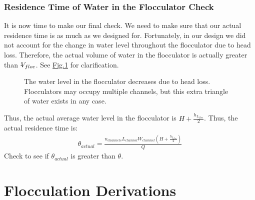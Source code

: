 \documentclass[letterpaper,10pt,english]{sphinxmanual}
\let\sphinxpxdimen\pdfpxdimen\else\newdimen\sphinxpxdimen
\begin{document}
{\subsection{Residence Time of Water in the Flocculator Check}
\label{\detokenize{Flocculation/Floc_Design:residence-time-of-water-in-the-flocculator-check}}
It is now time to make our final check. We need to make sure that our actual residence time is  as much as we designed for. Fortunately, in our design we did not account for the change in water level throughout the flocculator due to head loss. Therefore, the actual volume of water in the flocculator is actually greater than \(\rlap{-} V_{floc}\). See \hyperref[\detokenize{Flocculation/Floc_Design:figure-flocculator-head-loss}]{Fig.\@ \ref{\detokenize{Flocculation/Floc_Design:figure-flocculator-head-loss}}} for clarification.

\begin{figure}[htbp]
\centering
\capstart

\noindent\sphinxincludegraphics[width=400\sphinxpxdimen]{{Flocculator_head_loss}.jpg}
\caption{The water level in the flocculator decreases due to head loss. Flocculators may occupy multiple channels, but this extra triangle of water exists in any case.}\label{\detokenize{Flocculation/Floc_Design:id19}}\label{\detokenize{Flocculation/Floc_Design:figure-flocculator-head-loss}}\end{figure}

Thus, the actual average water level in the flocculator is \(H + \frac{h_{L_{floc}}}{2}\). Thus, the actual residence time is:
\begin{equation}\label{equation:Flocculation/Floc_Design:Flocculation/Floc_Design:31}
\begin{split}\theta_{actual} = \frac{n_{channels} L_{channel} W_{channel} \left( H + \frac{h_{L_{floc}}}{2} \right)} {Q}\end{split}
\end{equation}
Check to see if \(\theta_{actual}\) is greater than \(\theta\).




\chapter{Flocculation Derivations}
\label{\detokenize{Flocculation/Floc_Derivations:flocculation-derivations}}\label{\detokenize{Flocculation/Floc_Derivations:title-flocculation-derivations}}\label{\detokenize{Flocculation/Floc_Derivations::doc}}

}
\end{document}
